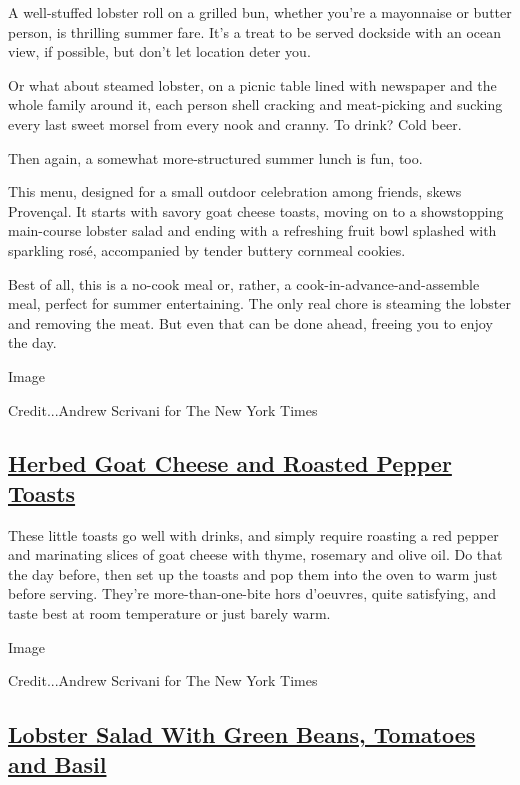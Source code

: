 A well-stuffed lobster roll on a grilled bun, whether you're a
mayonnaise or butter person, is thrilling summer fare. It's a treat to
be served dockside with an ocean view, if possible, but don't let
location deter you.

Or what about steamed lobster, on a picnic table lined with newspaper
and the whole family around it, each person shell cracking and
meat-picking and sucking every last sweet morsel from every nook and
cranny. To drink? Cold beer.

Then again, a somewhat more-structured summer lunch is fun, too.

This menu, designed for a small outdoor celebration among friends, skews
Provençal. It starts with savory goat cheese toasts, moving on to a
showstopping main-course lobster salad and ending with a refreshing
fruit bowl splashed with sparkling rosé, accompanied by tender buttery
cornmeal cookies.

Best of all, this is a no-cook meal or, rather, a
cook-in-advance-and-assemble meal, perfect for summer entertaining. The
only real chore is steaming the lobster and removing the meat. But even
that can be done ahead, freeing you to enjoy the day.

Image

Credit...Andrew Scrivani for The New York Times

\hypertarget{herbed-goat-cheese-and-roasted-pepper-toasts}{%
\subsection{\texorpdfstring{\href{https://cooking.nytimes.com/recipes/1021321-herbed-goat-cheese-and-roasted-pepper-toasts}{Herbed
Goat Cheese and Roasted Pepper
Toasts}}{Herbed Goat Cheese and Roasted Pepper Toasts}}\label{herbed-goat-cheese-and-roasted-pepper-toasts}}

These little toasts go well with drinks, and simply require roasting a
red pepper and marinating slices of goat cheese with thyme, rosemary and
olive oil. Do that the day before, then set up the toasts and pop them
into the oven to warm just before serving. They're more-than-one-bite
hors d'oeuvres, quite satisfying, and taste best at room temperature or
just barely warm.

Image

Credit...Andrew Scrivani for The New York Times

\hypertarget{lobster-salad-with-green-beans-tomatoes-and-basil}{%
\subsection{\texorpdfstring{\href{https://cooking.nytimes.com/recipes/1021322-lobster-salad-with-green-beans-tomatoes-and-basil}{Lobster
Salad With Green Beans, Tomatoes and
Basil}}{Lobster Salad With Green Beans, Tomatoes and Basil}}\label{lobster-salad-with-green-beans-tomatoes-and-basil}}

